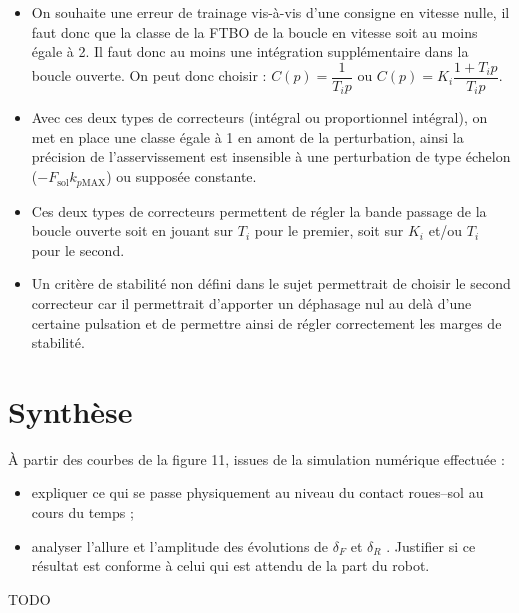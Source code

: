 \documentclass[11pt]{article}
\begin{document}
\begin{UPSTIcorrige}
\begin{itemize}
\item On souhaite une erreur de trainage vis-à-vis d'une consigne en vitesse nulle, il faut donc que la classe de la FTBO de la boucle en vitesse soit au moins égale à 2. Il faut donc au moins une intégration supplémentaire dans la boucle ouverte. On peut donc choisir : $C(p)=\dfrac{1}{T_ip}$ ou $C(p)=K_i\dfrac{1+T_ip}{T_ip}$.
\item Avec ces deux types de correcteurs (intégral ou proportionnel intégral), on met en place une classe égale à 1 en amont de la perturbation, ainsi la précision de l'asservissement est insensible à une perturbation de type échelon ($-F_{\text{sol}}k_{p\text{MAX}}$) ou supposée constante.
\item Ces deux types de correcteurs permettent de régler la bande passage de la boucle ouverte soit en jouant sur $T_i$ pour le premier, soit sur $K_i$ et/ou $T_i$ pour le second. 
\item Un critère de stabilité non défini dans le sujet permettrait de choisir le second correcteur car il permettrait d'apporter un déphasage nul au delà d'une certaine pulsation et de permettre ainsi de régler correctement les marges de stabilité.
\end{itemize}
\end{UPSTIcorrige}



\section{Synthèse}


\UPSTIquestion  À partir des courbes de la figure 11, issues de la simulation numérique effectuée :
\begin{itemize}
\item expliquer ce qui se passe physiquement au niveau du contact roues–sol au cours du temps ;
\item analyser l’allure et l’amplitude des évolutions de $\delta_F$ et $\delta_R$ . Justifier si ce résultat est conforme à celui qui est attendu de la part du robot.
\end{itemize}

\begin{UPSTIcorrige}
TODO
\end{UPSTIcorrige}
\end{document}
